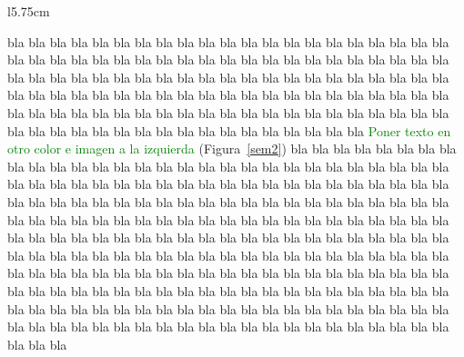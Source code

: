 \documentclass[12pt]{book}%
\theoremstyle{definition}%
\begin{document}
\begin{wrapfigure}{l}{5.75cm}
\begin{center}
\caption{Paralelogramo en el plano.}\label{sem2}
\end{center}
\end{wrapfigure}

bla bla bla bla bla bla bla bla bla bla bla bla bla bla bla bla bla bla bla bla bla bla bla bla bla bla bla bla bla bla bla bla bla bla bla bla bla bla bla bla bla bla bla bla bla bla bla bla bla bla bla bla bla bla bla bla bla bla bla bla bla bla bla bla bla bla bla bla bla bla bla bla bla bla bla bla bla bla bla bla bla bla bla bla bla bla bla bla bla bla bla bla bla bla bla bla bla bla bla bla bla bla bla bla bla bla bla bla bla bla bla bla bla bla bla bla bla bla bla bla bla bla  \textcolor{green}{Poner texto en otro color e imagen a la izquierda} (Figura~\ref{sem2}) bla bla bla bla bla bla bla bla bla bla bla bla bla bla bla bla bla bla bla bla bla bla bla bla bla bla bla bla bla bla bla bla bla bla bla bla bla bla bla bla bla bla bla bla bla bla bla bla bla bla bla bla bla bla bla bla bla bla bla bla bla bla bla bla bla bla bla bla bla bla bla bla bla bla bla bla bla bla bla bla bla bla bla bla bla bla bla bla bla bla bla bla bla bla bla bla bla bla bla bla bla bla bla bla bla bla bla bla bla bla bla bla bla bla bla bla bla bla bla bla bla bla bla bla bla bla bla bla bla bla bla bla bla bla bla bla bla bla bla bla bla bla bla bla bla bla bla bla bla bla bla bla bla bla bla bla bla bla bla bla bla bla bla bla bla bla bla bla bla bla bla bla bla bla bla bla bla bla bla bla bla bla bla bla bla bla bla bla bla bla bla bla bla bla bla bla bla bla bla bla bla bla bla bla bla bla bla bla bla bla bla bla bla bla bla bla bla bla bla bla bla
\end{document}
